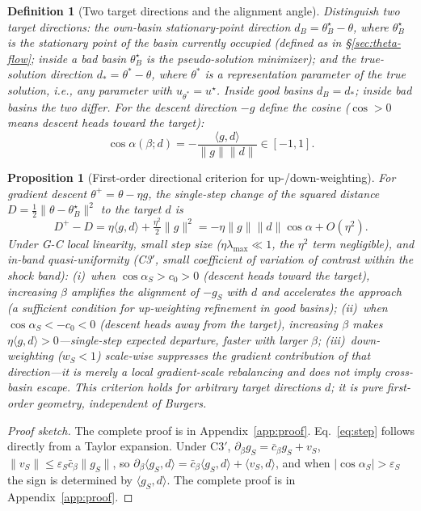 \documentclass[11pt]{article}
\newtheorem{definition}{Definition}[section]
\newtheorem{proposition}{Proposition}[section]
\numberwithin{equation}{section}
\begin{document}
\begin{definition}[Two target directions and the alignment angle]\label{def:align}
Distinguish two target directions: the \emph{own-basin stationary-point direction} $d_B=\theta_B^\star-\theta$, where $\theta_B^\star$ is the stationary point of the basin currently occupied (defined as in \S\ref{sec:theta-flow}; inside a bad basin $\theta_B^\star$ is the pseudo-solution minimizer); and the \emph{true-solution direction} $d_*=\theta^*-\theta$, where $\theta^*$ is a representation parameter of the true solution, i.e., any parameter with $u_{\theta^*}=u^\star$. Inside good basins $d_B=d_*$; inside bad basins the two differ. For the descent direction $-g$ define the cosine ($\cos>0$ means descent heads toward the target):
\begin{equation}\label{eq:cos}
\cos\alpha(\beta;d)=-\frac{\langle g,d\rangle}{\|g\|\|d\|}\in[-1,1].
\end{equation}
\end{definition}

\begin{proposition}[First-order directional criterion for up-/down-weighting]\label{prop:align}
For gradient descent $\theta^+=\theta-\eta g$, the single-step change of the squared distance $D=\tfrac12\|\theta-\theta_B^\star\|^2$ to the target $d$ is
\begin{equation}\label{eq:step}
D^+-D=\eta\langle g,d\rangle+\tfrac{\eta^2}{2}\|g\|^2
=-\eta\|g\|\|d\|\cos\alpha+O(\eta^2).
\end{equation}
Under G-C local linearity, small step size ($\eta\lambda_{\max}\ll1$, the $\eta^2$ term negligible), and in-band quasi-uniformity (C3$'$, small coefficient of variation of contrast within the shock band): (i)~when $\cos\alpha_S>c_0>0$ (descent heads toward the target), increasing $\beta$ amplifies the alignment of $-g_S$ with $d$ and \emph{accelerates the approach} (a sufficient condition for up-weighting refinement in good basins); (ii)~when $\cos\alpha_S<-c_0<0$ (descent heads away from the target), increasing $\beta$ makes $\eta\langle g,d\rangle>0$---\emph{single-step expected departure, faster with larger $\beta$}; (iii)~down-weighting ($w_S<1$) scale-wise suppresses the gradient contribution of that direction---it is merely a local gradient-scale rebalancing and does not imply cross-basin escape. This criterion holds for \emph{arbitrary} target directions $d$; it is pure first-order geometry, independent of Burgers.
\end{proposition}
\begin{proof}[Proof sketch] The complete proof is in Appendix~\ref{app:proof}.
Eq.~\eqref{eq:step} follows directly from a Taylor expansion. Under C3$'$, $\partial_\beta g_S=\bar c_\beta g_S+v_S$, $\|v_S\|\le\varepsilon_S\bar c_\beta\|g_S\|$, so $\partial_\beta\langle g_S,d\rangle=\bar c_\beta\langle g_S,d\rangle+\langle v_S,d\rangle$, and when $|\cos\alpha_S|>\varepsilon_S$ the sign is determined by $\langle g_S,d\rangle$. The complete proof is in Appendix~\ref{app:proof}.
\end{proof}
\end{document}
